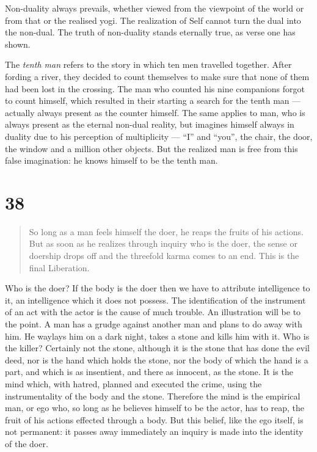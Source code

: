 \documentclass[12pt]{report}
\begin{document}
{

Non-duality always prevails, whether viewed from the viewpoint of the
world or from that or the realised yogi. The realization of Self
cannot turn the dual into the non-dual. The truth of non-duality
stands eternally true, as verse one has shown.

The \emph{tenth man} refers to the story in which ten men travelled
together. After fording a river, they decided to count themselves to
make sure that none of them had been lost in the crossing. The man who
counted his nine companions forgot to count himself, which resulted in
their starting a search for the tenth man --- actually always present
as the counter himself. The same applies to man, who is always present
as the eternal non-dual reality, but imagines himself always in
duality due to his perception of multiplicity --- ``I'' and ``you'',
the chair, the door, the window and a million other objects. But the
realized man is free from this false imagination: he knows himself to
be the tenth man.

\section*{38}

\begin{quote}
  So long as a man feels himself the doer, he reaps the fruits of his
  actions. But as soon as he realizes through inquiry who is the doer,
  the sense or doership drops off and the threefold karma comes to an
  end. This is the final Liberation.
\end{quote}


Who is the doer? If the body is the doer then we have to attribute
intelligence to it, an intelligence which it does not possess. The
identification of the instrument of an act with the actor is the cause
of much trouble. An illustration will be to the point. A man has a
grudge against another man and plans to do away with him. He waylays
him on a dark night, takes a stone and kills him with it. Who is the
killer? Certainly not the stone,  although it is the stone that has
done the evil deed, nor is the hand which holds the stone, nor the
body of which the hand is a part, and which is as insentient, and
there as innocent, as the stone. It is the mind which, with hatred,
planned and executed the crime, using the instrumentality of the body
and the stone. Therefore the mind is the empirical man, or ego who, so
long as he believes himself to be the actor, has to reap, the fruit of
his actions effected through a body. But this belief, like the ego
itself, is not permanent: it passes away immediately an inquiry is
made into the identity of the doer.

}
\end{document}
